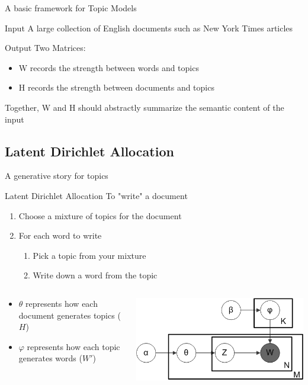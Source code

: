 \documentclass[compress]{beamer}
\begin{document}
\begin{frame}{A basic framework for Topic Models}
\begin{block}{Input}
A large collection of English documents such as New York Times articles
\end{block}

\begin{block}{Output}
Two Matrices:
\begin{itemize}
\item W records the strength between words and topics
\item H records the strength between documents and topics
\end{itemize}
Together, W and H should abstractly summarize the semantic content of the input
\end{block}
\end{frame}

\subsection{Latent Dirichlet Allocation}

\begin{frame}{A generative story for topics}
\begin{block}{Latent Dirichlet Allocation}
To "write" a document
\begin{enumerate}
\item Choose a mixture of topics for the document
\item For each word to write
    \begin{enumerate}
    \item Pick a topic from your mixture
    \item Write down a word from the topic
    \end{enumerate}
\end{enumerate}
\end{block}

\begin{columns}
\begin{column}[1]{6cm}
\begin{itemize}
\item $\theta$ represents how each document generates topics ($H$)
\item $\varphi$ represents how each topic generates words ($W'$)
\end{itemize}
\end{column}
\begin{column}[2]{4cm}
\includegraphics[width=.80\textwidth,height=.40\textwidth]{figures/Smoothed_LDA.png}
\end{column}
\end{columns}
\end{frame}
\end{document}
